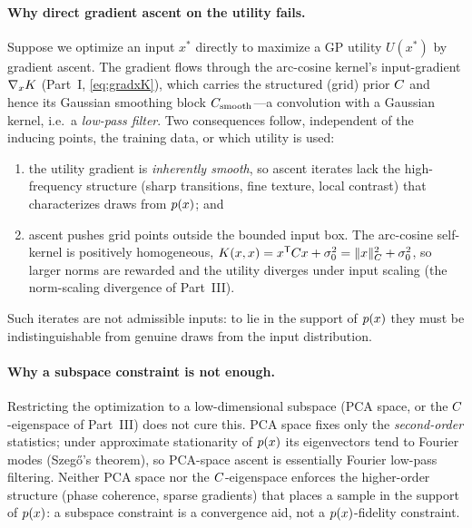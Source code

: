 \paragraph{Why direct gradient ascent on the utility fails.}
Suppose we optimize an input $x^{*}$ directly to maximize a GP utility $U(x^{*})$
by gradient ascent. The gradient flows through the arc-cosine kernel's
input-gradient $\nabla_{x}K$ (Part~I, \eqref{eq:gradxK}), which carries the
structured (grid) prior $C$ and hence its Gaussian smoothing block
$C_{\mathrm{smooth}}$---a convolution with a Gaussian kernel, i.e.\ a \emph{low-pass filter}. Two
consequences follow, independent of the inducing points, the training data, or
which utility is used:
\begin{enumerate}[leftmargin=1.4em,itemsep=1pt,topsep=2pt]
  \item the utility gradient is \emph{inherently smooth}, so ascent iterates lack
        the high-frequency structure (sharp transitions, fine texture, local
        contrast) that characterizes draws from $p(x)$; and
  \item ascent pushes grid points outside the bounded input box. The arc-cosine
        self-kernel is positively homogeneous, $K(x,x)=x^{\mathsf{T}}
        C x+\sigma_{0}^{2}=\lVert x\rVert_{C}^{2}+\sigma_{0}^{2}$, so larger norms
        are rewarded and the utility diverges under input scaling (the
        norm-scaling divergence of Part~III).
\end{enumerate}
Such iterates are not admissible inputs: to lie in the support of $p(x)$ they must
be indistinguishable from genuine draws from the input distribution.

\paragraph{Why a subspace constraint is not enough.}
Restricting the optimization to a low-dimensional subspace (PCA space, or the
$C$-eigenspace of Part~III) does not cure this. PCA space fixes only the
\emph{second-order} statistics; under approximate stationarity of $p(x)$ its
eigenvectors tend to Fourier modes (Szeg\H{o}'s theorem), so PCA-space ascent is
essentially Fourier low-pass filtering. Neither PCA space nor the
$C$-eigenspace enforces the higher-order structure (phase coherence, sparse
gradients) that places a sample in the support of $p(x)$: a subspace constraint is a
convergence aid, not a $p(x)$-fidelity constraint.

